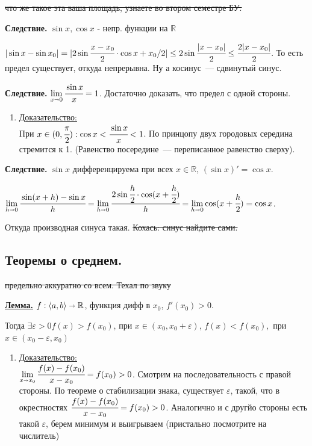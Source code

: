 \documentclass{article}
\newcommand{\thmm}[1]{\underline{\textbf{#1}}}
\newcommand{\prooff}[1]{{\underline{Доказательство:}} \\ }
\begin{document}
 \sout{что же такое эта ваша площадь, узнаете во втором семестре БУ.}

\textbf{Следствие.} $\sin x, \cos x$ - непр. функции на $\mathbb{R}$

$|\sin x - \sin x_0| = |2 \sin \cfrac{x-x_0}{2}\cdot \cos {x+x_0}/2| \leq 2 \sin \cfrac{|x-x_0|}{2}\leq  \cfrac{2|x-x_0|}{2} $. То есть предел существует, откуда непрерывна. Ну а косинус~--- сдвинутый синус.

\textbf{Следствие.} $\lim\limits_{x\shortrightarrow 0} \cfrac{\sin x}{x} = 1$. Достаточно доказать, что предел с одной стороны.
\begin{enumerate}
    \item[] \prooff{}
    При $x \in (0,\cfrac{\pi}{2}): \cos x< \cfrac{\sin x }{x}<1$. По принцопу двух городовых середина стремится к 1. (Равенство посередине~--- переписанное равенство сверху).
\end{enumerate}

\textbf{Следствие.} $\sin x$ дифференцируема при всех $x \in \mathbb{R}$, $(\sin x)' = \cos x$.

$\lim\limits_{h\shortrightarrow 0} \cfrac{\sin(x+h) -\sin x}{h} = \lim\limits_{h \shortrightarrow 0} \cfrac{2 \sin \cfrac{h}{2}\cdot \cos (x+ \cfrac{h}{2})}{h} = \lim \limits_{h\shortrightarrow 0} \cos (x+\cfrac{h}{2}) = \cos x$.

Откуда производная синуса такая. \sout{Кохась: синус найдите сами.}

\pagebreak
\subsection{Теоремы о среднем.}

\sout{предельно аккуратно со всем. Техал по звуку}

\thmm{Лемма.} $f: \langle a,b \rangle \shortrightarrow \mathbb{R}$, функция дифф в $x_0$, $f'(x_0)>0$.

Тогда $\exists \varepsilon>0 f(x) >f(x_0)$, при $x\in (x_0,x_0 + \varepsilon)$, $f(x)< f(x_0),$ при $x \in (x_0-\varepsilon,x_0)$

\begin{enumerate}
    \item[] \prooff{}
    $\lim\limits_{x \shortrightarrow x_0} \cfrac{f(x)-f(x_0)}{x-x_0}= f(x_0)>0$. Смотрим на последовательность с правой стороны. По теореме о стабилизации знака, существует $\varepsilon$, такой, что  в окрестностях $\cfrac{f(x)-f(x_0)}{x-x_0}= f(x_0)>0$. Аналогично и с другйо стороны есть такой $
    \varepsilon$, берем минимум и выигрываем (пристально посмотрите на числитель)
 
\end{enumerate}
\end{document}

